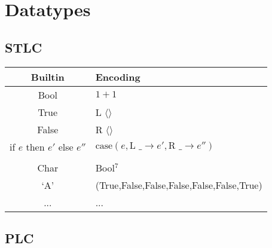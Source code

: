 \documentclass[11pt]{article}
\begin{document}
\section{Datatypes}
{
    \subsection{STLC}
    {
        \begin{tabular}{c | l}
        Builtin & Encoding \\
        \hline
        Bool & \(1+1\) \\
        True & L \(\langle\rangle\) \\
        False & R \(\langle\rangle\) \\
        if \(e\) then \(e'\) else \(e''\) & \(\text{case}(e,\text{L \_}\rightarrow e',\text{R \_}\rightarrow e'')\) \\
        \\
        Char & Bool\(^7\) \\
        `A' & (True,False,False,False,False,False,True) \\
        ... & ...
        \end{tabular}
    }
    \subsection{PLC}
    {

}}
\end{document}
